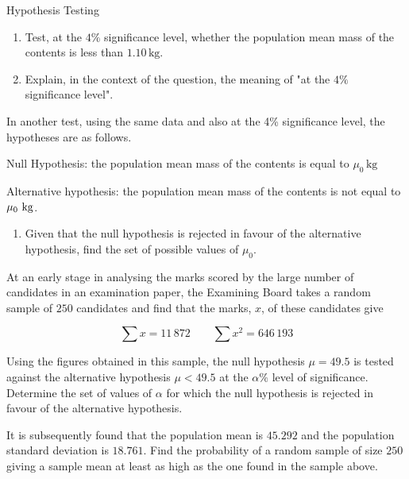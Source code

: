 \documentclass[11pt,a4paper]{book}
\begin{document}
\begin{assignment}{Hypothesis Testing}
\begin{numedquestion}
\begin{enumerate}[label=(\alph*)]
\item Test, at the $4\%$ significance level, whether the population
mean mass of the contents is less than $1.10\,\text{kg}$.

\item Explain, in the context of the question, the meaning of "at the $4\%$ significance level". 

\end{enumerate}

In another test, using the same data and also at the 4\% significance
level, the hypotheses are as follows.

Null Hypothesis: the population mean mass of the contents is equal
to $\mu_{0}\,\text{kg}$

Alternative hypothesis: the population mean mass of the contents is
not equal to $\mu_{0}\text{ \text{kg}}$.

\begin{enumerate}[label=(\alph*),start=3] 

\item Given that the null hypothesis is rejected in favour of the
alternative hypothesis, find the set of possible values of $\mu_{0}$.

\end{enumerate}
\end{numedquestion}


\begin{numedquestion}
At an early stage in analysing the marks scored by the large number
of candidates in an examination paper, the Examining Board takes a
random sample of $250$ candidates and find that the marks, $x$,
of these candidates give 

\[
\sum x=11\,872\qquad\sum x^{2}=646\,193
\]

Using the figures obtained in this sample, the null hypothesis $\mu=49.5$ is tested against the alternative hypothesis $\mu<49.5$ at the $\alpha\%$ level of significance. Determine the set of values of $\alpha$ for which the null hypothesis is rejected in favour of the alternative hypothesis.

It is subsequently found that the population mean is $45.292$ and
the population standard deviation is $18.761$. Find the probability
of a random sample of size $250$ giving a sample mean at least as
high as the one found in the sample above.
\end{numedquestion}

\end{assignment}
\end{document}
